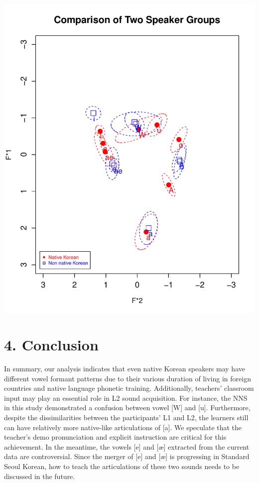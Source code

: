 \documentclass[man, fleqn, noextraspace]{apa6}
\begin{document}
\includegraphics{Group_5_Final_paper_files/figure-latex/Vowel Chart of Mean Values-3.pdf}

\section{\texorpdfstring{\textbf{4.
Conclusion}}{4. Conclusion}}\label{conclusion}

In summary, our analysis indicates that even native Korean speakers may
have different vowel formant patterns due to their various duration of
living in foreign countries and native language phonetic training.
Additionally, teachers' classroom input may play an essential role in L2
sound acquisition. For instance, the NNS in this study demonstrated a
confusion between vowel {[}W{]} and {[}u{]}. Furthermore, despite the
dissimilarities between the participants' L1 and L2, the learners still
can have relatively more native-like articulations of {[}a{]}. We
speculate that the teacher's demo pronunciation and explicit instruction
are critical for this achievement. In the meantime, the vowels {[}e{]}
and {[}æ{]} extracted from the current data are controversial. Since the
merger of {[}e{]} and {[}æ{]} is progressing in Standard Seoul Korean,
how to teach the articulations of these two sounds needs to be discussed
in the future. \newpage
\end{document}
